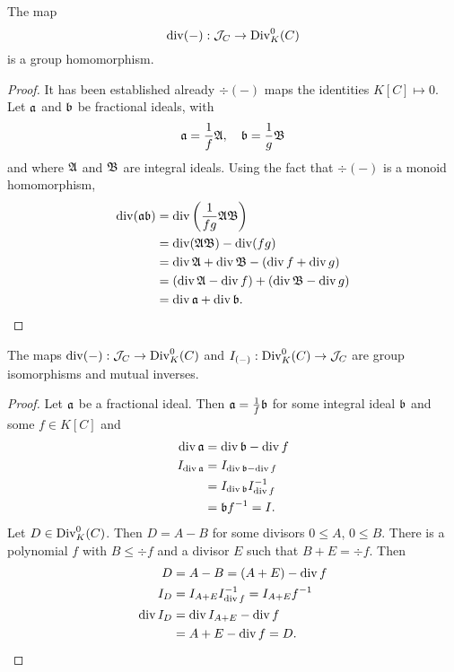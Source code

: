 \begin{theorem}
  The map
    \[ \div(-) : \cal J_C \to \Div_K^0(C) \]
  is a group homomorphism.
\end{theorem}
\begin{proof}
  It has been established already $\div(-)$ maps the identities $K[C] \mapsto 0$.
  Let $\frak a$ and $\frak b$ be fractional ideals, with
  \[ \frak a = \frac 1 f \frak A, ~~~ \frak b = \frac 1 g \frak B \]
  and where $\frak A$ and $\frak B$ are integral ideals.
  Using the fact that $\div(-)$ is a monoid homomorphism,
  \begin{align*}
    \div(\frak a \frak b)
      &= \div \left( \frac 1 {fg} \frak A \frak B \right) \\
      &= \div (\frak A \frak B) - \div (fg) \\
      &= \div \frak A  + \div \frak B - (\div f + \div g) \\
      &= (\div \frak A - \div f) + (\div \frak B - \div g) \\
      &= \div \frak a + \div \frak b.
  \end{align*}
\end{proof}

\begin{theorem}
  The maps $\div(-) : \cal J_C \to \Div_K^0(C)$ and $I_{(-)} : \Div_K^0(C) \to \cal J_C$
  are group isomorphisms and mutual inverses.
\end{theorem}
\begin{proof}
  Let $\frak a$ be a fractional ideal.
  Then $\frak a = \frac 1 f \frak b$ for some integral ideal $\frak b$ and some $f \in K[C]$ and
  \begin{align*}
    \div \frak a &= \div \frak b - \div f \\
    I_{\div \frak a} &= I_{\div \frak b - \div f} \\
      &= I_{\div \frak b} I_{\div f}\inv \\
      &= \frak b f\inv = I.
  \end{align*}
  Let $D \in \Div_K^0(C)$.
  Then $D = A - B$ for some divisors $0 \leq A$, $0 \leq B$.
  There is a polynomial $f$ with $B \leq \div f$
  and a divisor $E$ such that $B + E = \div f$.
  Then
  \begin{align*}
    D &= A - B = (A + E) - \div f \\
    I_D &= I_{A + E}I_{\div f}\inv = I_{A + E}f\inv \\
    \div I_D &= \div I_{A + E} - \div f \\
    &= A + E - \div f = D.
  \end{align*}
\end{proof}

